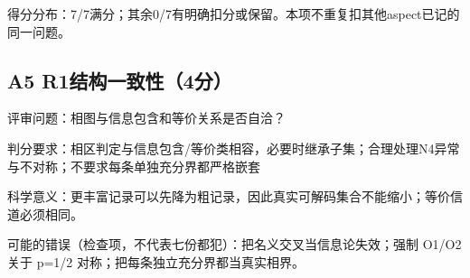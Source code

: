 \documentclass[11pt,a4paper]{article}
\begin{document}
得分分布：7/7满分；其余0/7有明确扣分或保留。本项不重复扣其他aspect已记的同一问题。

\clearpage
\subsection{A5 R1结构一致性（4分）}
\label{aspect:A5}
评审问题：相图与信息包含和等价关系是否自洽？

判分要求：相区判定与信息包含/等价类相容，必要时继承子集；合理处理N4异常与不对称；不要求每条单独充分界都严格嵌套

科学意义：更丰富记录可以先降为粗记录，因此真实可解码集合不能缩小；等价信道必须相同。

可能的错误（检查项，不代表七份都犯）：把名义交叉当信息论失效；强制 O1/O2 关于 p=1/2 对称；把每条独立充分界都当真实相界。
\end{document}
